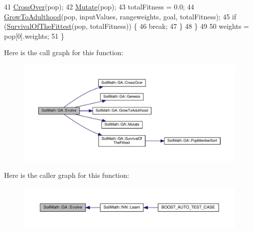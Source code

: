 \begin{DoxyCode}
41     \hyperlink{class_soil_math_1_1_g_a_abf408d603b2afb188a6d265eb6309b69}{CrossOver}(pop);
42     \hyperlink{class_soil_math_1_1_g_a_a489f2afd54086c14f45b654aeec0fe3c}{Mutate}(pop);
43     totalFitness = 0.0;
44     \hyperlink{class_soil_math_1_1_g_a_aff791f50f889beb74e854942f8883b58}{GrowToAdulthood}(pop, inputValues, rangeweights, goal, totalFitness);
45     \textcolor{keywordflow}{if} (\hyperlink{class_soil_math_1_1_g_a_ac2c10631815408d044738f678c67e98b}{SurvivalOfTheFittest}(pop, totalFitness)) \{
46       \textcolor{keywordflow}{break};
47     \}
48   \}
49 
50   weights = pop[0].weights;
51 \}
\end{DoxyCode}


Here is the call graph for this function\+:
\nopagebreak
\begin{figure}[H]
\begin{center}
\leavevmode
\includegraphics[width=350pt]{class_soil_math_1_1_g_a_a4290310d89064946c645673840591540_cgraph}
\end{center}
\end{figure}




Here is the caller graph for this function\+:
\nopagebreak
\begin{figure}[H]
\begin{center}
\leavevmode
\includegraphics[width=350pt]{class_soil_math_1_1_g_a_a4290310d89064946c645673840591540_icgraph}
\end{center}
\end{figure}


\hypertarget{class_soil_math_1_1_g_a_aca448f36c1f98b4906d0754cf354cccf}{}
